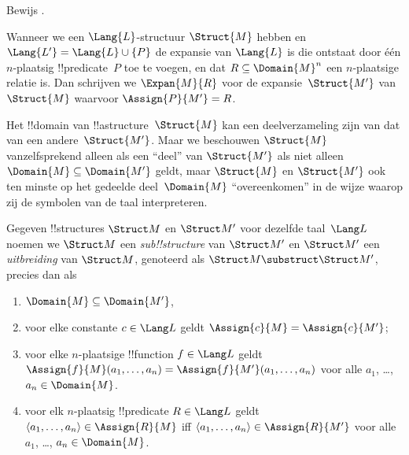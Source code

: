 \documentclass[openany]{memoir}
\begin{document}
\begin{prob}
Bewijs .
\end{prob}

\begin{defn}
Wanneer we een $\Lang{L}$-structuur $\Struct{M}$ hebben en $\Lang{L'} =
\Lang{L} \cup \{P\}$ de expansie van $\Lang{L}$ is die ontstaat door
één $n$-plaatsig !!{predicate}~$P$ toe te voegen, en dat
$R \subseteq \Domain{M}^n$ een $n$-plaatsige relatie is. Dan schrijven
we $\Expan{M}{R}$ voor de expansie~$\Struct{M'}$ van~$\Struct{M}$
waarvoor $\Assign{P}{M'} = R$.
\end{defn}
\endgroup

\begingroup
\def\olfilename{OLP-0185}
\def\olfilepath{content/model-theory/basics/}
\hypertarget{unit-OLP-0185}{}




Het !!{domain} van !!a{structure}~$\Struct{M}$ kan een deelverzameling
zijn van dat van een andere~$\Struct{M'}$.  Maar we beschouwen
$\Struct{M}$ vanzelfsprekend alleen als een ``deel'' van $\Struct{M'}$
als niet alleen $\Domain{M} \subseteq \Domain{M'}$ geldt, maar
$\Struct{M}$ en $\Struct{M'}$ ook ten minste op het gedeelde
deel~$\Domain{M}$ ``overeenkomen'' in de wijze waarop zij de symbolen
van de taal interpreteren.

\begin{defn}
Gegeven !!{structure}s $\Struct M$ en $\Struct M'$ voor dezelfde
taal~$\Lang L$ noemen we $\Struct M$ een \emph{sub!!{structure}} van
$\Struct M'$ en $\Struct M'$ een \emph{uitbreiding} van $\Struct M$,
genoteerd als $\Struct M \substruct \Struct M'$, precies dan als
\begin{enumerate}
\item $\Domain{M} \subseteq \Domain{M'}$,
\item voor elke constante $c \in \Lang L$ geldt $\Assign{c}{M} =
    \Assign{c}{M'}$;
\item voor elke $n$-plaatsige !!{function} $f \in \Lang L$ geldt
  $\Assign{f}{M}(a_1, \dots, a_n) = \Assign{f}{M'}(a_1, \dots, a_n)$
  voor alle $a_1$, \dots, $a_n \in \Domain{M}$.
\item voor elk $n$-plaatsig !!{predicate} $R \in \Lang L$ geldt $\langle
  a_1, \dots, a_n\rangle \in \Assign{R}{M}$ iff $\langle a_1, \dots,
  a_n\rangle \in \Assign{R}{M'}$ voor alle $a_1$, \dots, $a_n \in
  \Domain{M}$.
\end{enumerate}
\end{defn}
\end{document}
